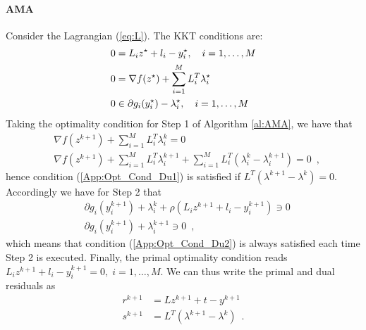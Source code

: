 \documentclass[openany]{now}
\begin{document}
\paragraph{AMA} Consider the Lagrangian (\ref{eq:L}). The KKT conditions are:
\begin{align}
 0 &= L_iz^\star+l_i-y_i^\star, \quad i=1,\ldots,M {\label{App:Opt_Cond_Pr}}\\
 0 &= \nabla f(z^\star) + \sum_{i=1}^M L_i^T\lambda_i^\star {\label{App:Opt_Cond_Du1}}\\
 0 &\in \partial g_i(y_i^\star) - \lambda_i^\star, \quad i=1,\ldots,M {\label{App:Opt_Cond_Du2}}
\end{align} 
Taking the optimality condition for Step 1 of Algorithm \ref{al:AMA}, we have that
\begin{align*}
& \nabla f(z^{k+1}) + \sum_{i=1}^M L_i^T\lambda_i^k = 0 \\
& \nabla f(z^{k+1}) + \sum_{i=1}^M L_i^T\lambda_i^{k+1} + \sum_{i=1}^M L_i^T(\lambda_i^k-\lambda_i^{k+1}) = 0\enspace,
\end{align*}
hence condition (\ref{App:Opt_Cond_Du1}) is satisfied if $L^T(\lambda^{k+1}-\lambda^{k})=0$.
Accordingly we have for Step 2 that 
\begin{align*}
& \partial g_i(y_i^{k+1}) + \lambda_i^k + \rho(L_iz^{k+1}+l_i-y_i^{k+1}) \ni 0 \\
& \partial g_i(y_i^{k+1}) + \lambda_i^{k+1} \ni 0\enspace,
\end{align*}
which means that condition (\ref{App:Opt_Cond_Du2}) is always satisfied each time Step 2 is executed. Finally, the primal optimality condition reads
$L_iz^{k+1}+l_i-y_i^{k+1}=0,\;i=1,\ldots,M$. We can thus write the primal and dual residuals as
\begin{align}
 r^{k+1} &= Lz^{k+1}+t-y^{k+1} \\
 s^{k+1} &= L^T(\lambda^{k+1}-\lambda^{k})\enspace.
\end{align}

\end{document}
